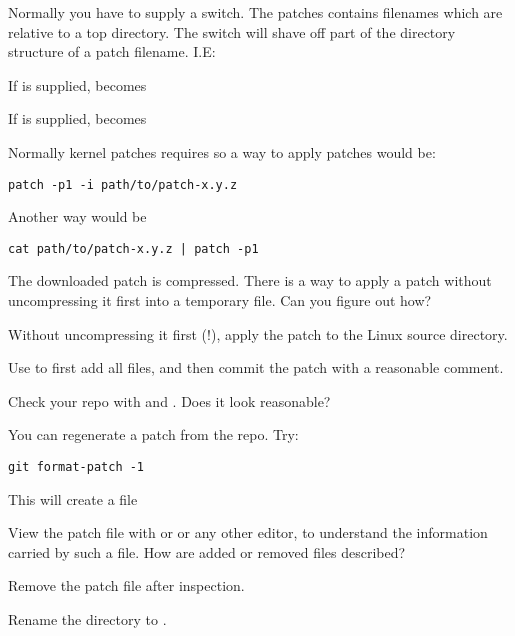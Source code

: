 Normally you have to supply a  switch. The patches contains filenames
which are relative to a top directory. The  switch will shave off
part of the directory structure of a patch filename. I.E:
 
If  is supplied,   becomes 

If  is supplied,   becomes  

Normally kernel patches requires  so a way to apply patches would be:

\begin{verbatim}
patch -p1 -i path/to/patch-x.y.z
\end{verbatim}

Another way would be

\begin{verbatim}
cat path/to/patch-x.y.z | patch -p1
\end{verbatim}

The downloaded patch is compressed. There is a way to apply a patch
without uncompressing it first into a temporary file.
Can you figure out how?

Without uncompressing it first (!), apply the patch to the Linux source directory.

Use  to first add all files, and then commit the patch with a reasonable comment.

Check your repo with  and . Does it look reasonable?

You can regenerate a patch from the repo. Try:

\begin{verbatim}
git format-patch -1
\end{verbatim}

This will create a file 

View the patch file with  or  or any other editor,
to understand the information carried by such a file. 
How are added or removed files described?

Remove the patch file after inspection.

Rename the  directory to .
